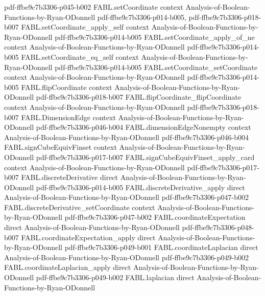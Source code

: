 \begin{theorem}
  {pdf-ffbe9c7b3306-p045-b002}
\proofstep
  {FABL.setCoordinate}
  {context}
  {Analysis-of-Boolean-Functions-by-Ryan-ODonnell}
  {pdf-ffbe9c7b3306-p014-b005,
    pdf-ffbe9c7b3306-p018-b007}
\proofstep
  {FABL.setCoordinate_apply_self}
  {context}
  {Analysis-of-Boolean-Functions-by-Ryan-ODonnell}
  {pdf-ffbe9c7b3306-p014-b005}
\proofstep
  {FABL.setCoordinate_apply_of_ne}
  {context}
  {Analysis-of-Boolean-Functions-by-Ryan-ODonnell}
  {pdf-ffbe9c7b3306-p014-b005}
\proofstep
  {FABL.setCoordinate_eq_self}
  {context}
  {Analysis-of-Boolean-Functions-by-Ryan-ODonnell}
  {pdf-ffbe9c7b3306-p014-b005}
\proofstep
  {FABL.setCoordinate_setCoordinate}
  {context}
  {Analysis-of-Boolean-Functions-by-Ryan-ODonnell}
  {pdf-ffbe9c7b3306-p014-b005}
\proofstep
  {FABL.flipCoordinate}
  {context}
  {Analysis-of-Boolean-Functions-by-Ryan-ODonnell}
  {pdf-ffbe9c7b3306-p018-b007}
\proofstep
  {FABL.flipCoordinate_flipCoordinate}
  {context}
  {Analysis-of-Boolean-Functions-by-Ryan-ODonnell}
  {pdf-ffbe9c7b3306-p018-b007}
\proofstep
  {FABL.DimensionEdge}
  {context}
  {Analysis-of-Boolean-Functions-by-Ryan-ODonnell}
  {pdf-ffbe9c7b3306-p046-b004}
\proofstep
  {FABL.dimensionEdgeNonempty}
  {context}
  {Analysis-of-Boolean-Functions-by-Ryan-ODonnell}
  {pdf-ffbe9c7b3306-p046-b004}
\proofstep
  {FABL.signCubeEquivFinset}
  {context}
  {Analysis-of-Boolean-Functions-by-Ryan-ODonnell}
  {pdf-ffbe9c7b3306-p017-b007}
\proofstep
  {FABL.signCubeEquivFinset_apply_card}
  {context}
  {Analysis-of-Boolean-Functions-by-Ryan-ODonnell}
  {pdf-ffbe9c7b3306-p017-b007}
\proofstep
  {FABL.discreteDerivative}
  {direct}
  {Analysis-of-Boolean-Functions-by-Ryan-ODonnell}
  {pdf-ffbe9c7b3306-p014-b005}
\proofstep
  {FABL.discreteDerivative_apply}
  {direct}
  {Analysis-of-Boolean-Functions-by-Ryan-ODonnell}
  {pdf-ffbe9c7b3306-p047-b002}
\proofstep
  {FABL.discreteDerivative_setCoordinate}
  {context}
  {Analysis-of-Boolean-Functions-by-Ryan-ODonnell}
  {pdf-ffbe9c7b3306-p047-b002}
\proofstep
  {FABL.coordinateExpectation}
  {direct}
  {Analysis-of-Boolean-Functions-by-Ryan-ODonnell}
  {pdf-ffbe9c7b3306-p048-b007}
\proofstep
  {FABL.coordinateExpectation_apply}
  {direct}
  {Analysis-of-Boolean-Functions-by-Ryan-ODonnell}
  {pdf-ffbe9c7b3306-p049-b001}
\proofstep
  {FABL.coordinateLaplacian}
  {direct}
  {Analysis-of-Boolean-Functions-by-Ryan-ODonnell}
  {pdf-ffbe9c7b3306-p049-b002}
\proofstep
  {FABL.coordinateLaplacian_apply}
  {direct}
  {Analysis-of-Boolean-Functions-by-Ryan-ODonnell}
  {pdf-ffbe9c7b3306-p049-b002}
\proofstep
  {FABL.laplacian}
  {direct}
  {Analysis-of-Boolean-Functions-by-Ryan-ODonnell}

\end{theorem}
